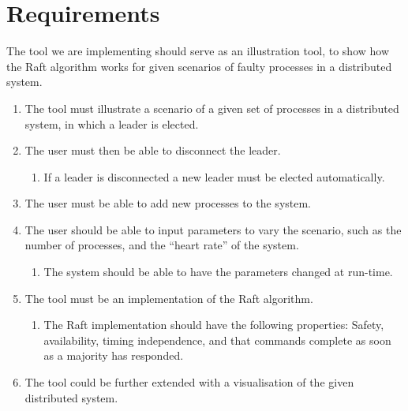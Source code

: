 \section{Requirements}

The tool we are implementing should serve as an illustration tool, to show how the Raft algorithm works for given scenarios of faulty processes in a distributed system.

\begin{enumerate}
\item The tool must illustrate a scenario of a given set of processes in a distributed system, in which a leader is elected.
\item The user must then be able to disconnect the leader.
	\begin{enumerate}
	\item If a leader is disconnected a new leader must be elected automatically.
	\end{enumerate}
\item The user must be able to add new processes to the system.
\item The user should be able to input parameters to vary the scenario, such as the number of processes, and the “heart rate” of the system.
	\begin{enumerate}
	\item The system should be able to have the parameters changed at run-time.
	\end{enumerate}
\item The tool must be an implementation of the Raft algorithm.
	\begin{enumerate}
	\item The Raft implementation should have the following properties: Safety, availability, timing independence, and that commands complete as soon as a majority has responded. 
	\end{enumerate}
\item The tool could be further extended with a visualisation of the given distributed system.
\end{enumerate}

